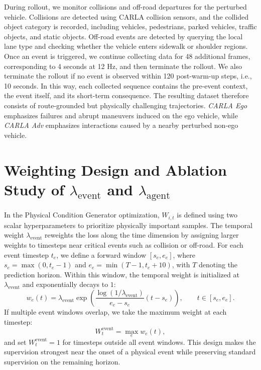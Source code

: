 \documentclass[runningheads]{llncs}
\begin{document}
During rollout, we monitor collisions and off-road departures for the perturbed vehicle. Collisions are detected using CARLA collision sensors, and the collided object category is recorded, including vehicles, pedestrians, parked vehicles, traffic objects, and static objects. Off-road events are detected by querying the local lane type and checking whether the vehicle enters sidewalk or shoulder regions. Once an event is triggered, we continue collecting data for 48 additional frames, corresponding to 4 seconds at 12 Hz, and then terminate the rollout. We also terminate the rollout if no event is observed within 120 post-warm-up steps, i.e., 10 seconds. In this way, each collected sequence contains the pre-event context, the event itself, and its short-term consequence. The resulting dataset therefore consists of route-grounded but physically challenging trajectories. \textit{CARLA Ego} emphasizes failures and abrupt maneuvers induced on the ego vehicle, while \textit{CARLA Adv} emphasizes interactions caused by a nearby perturbed non-ego vehicle.









\section{Weighting Design and Ablation Study of $\lambda_{\text{event}}$ and $\lambda_{\text{agent}}$}

In the Physical Condition Generator optimization, $W_{i,t}$ is defined using two scalar hyperparameters to prioritize physically important samples. The temporal weight $\lambda_{\text{event}}$ reweights the loss along the time dimension by assigning larger weights to timesteps near critical events such as collision or off-road. For each event timestep $t_e$, we define a forward window $[s_e, e_e]$, where $s_e = \max(0, t_e - 1)$ and $e_e = \min(T - 1, t_e + 10)$, with $T$ denoting the prediction horizon. Within this window, the temporal weight is initialized at $\lambda_{\text{event}}$ and exponentially decays to $1$:
\[
w_e(t)=
\lambda_{\text{event}}
\exp\!\left(
\frac{\log(1/\lambda_{\text{event}})}{e_e-s_e}(t-s_e)
\right), \qquad t\in[s_e,e_e].
\]
If multiple event windows overlap, we take the maximum weight at each timestep:
\[
W_t^{\text{event}}=\max_e w_e(t),
\]
and set $W_t^{\text{event}}=1$ for timesteps outside all event windows. This design makes the supervision strongest near the onset of a physical event while preserving standard supervision on the remaining horizon.
\end{document}
